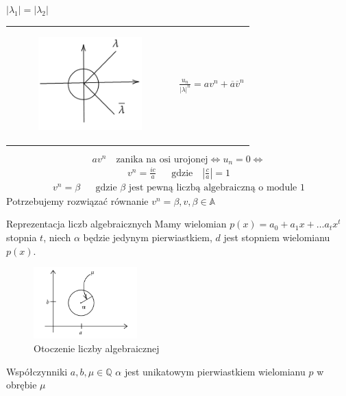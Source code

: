 \documentclass[handout]{beamer}
\def\A{\mathbb{A}}
\theoremstyle{definition}
\theoremstyle{named}
\begin{document}
\begin{frame}{$|\lambda_1| = |\lambda_2|$}
\begin{table}[]
    \centering
    \begin{tabular}{c c}
       \begin{figure}
            \centering
            \includegraphics[width=40mm]{img/skolem-1.png}
        \end{figure}  & 
            $\frac{u_n}{|\lambda|^n} = a v^{n} + \overline{a} \overline{v} ^{n} $
 
    \end{tabular}
\end{table}

\begin{equation*}
    a v^{n} \quad  \text{zanika na osi urojonej} \iff u_n = 0 \iff 
\end{equation*}
\begin{align*}
    v^{n} = \frac{i c}{a} && \text{gdzie} \quad |\frac{c}{a}| = 1
\end{align*}
\begin{align*}
    v^{n} = \beta && \text{gdzie $\beta$ jest pewną liczbą algebraiczną o module 1}
\end{align*}
\pause
Potrzebujemy rozwiązać równanie $v^{n} = \beta, v, \beta \in \A$

\end{frame}

\begin{frame}{Reprezentacja liczb algebraicznych }
    Mamy wielomian $p(x) = a_0 + a_1 x + \ldots a_{t} x^{t}$ stopnia $t$, niech $\alpha$ będzie jedynym pierwiastkiem, $d$ jest stopniem wielomianu $p(x)$.  
    \begin{figure}
        \centering
        \includegraphics[width=40mm]{img/reprez-skolem.png}
        \caption{Otoczenie liczby algebraicznej}
    \end{figure}
    Współczynniki $a, b,  \mu \in \mathbb{Q}$ 
    \pause
    \newline
    $\alpha$ jest unikatowym pierwiastkiem wielomianu $p$ w obrębie $\mu$
\end{frame}
\end{document}
